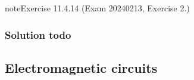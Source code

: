 \documentclass[letterpaper,10pt,english]{jupyterBook}
\begin{document}
\begin{sphinxadmonition}{note}{Exercise 11.4.14 (Exam 2024\sphinxhyphen{}02\sphinxhyphen{}13, Exercise 2.)}



\begin{figure}[htbp]
\centering

\noindent{}
\end{figure}
\subsubsection*{Solution \sphinxhyphen{} todo}
\end{sphinxadmonition}

\sphinxstepscope


\subsection{Electromagnetic circuits}
\label{\detokenize{ch/electrical-engineering-exercises-electromagnetic:electromagnetic-circuits}}\label{\detokenize{ch/electrical-engineering-exercises-electromagnetic:classical-electromagnetism-electrical-engineering-exercises-electromagnetic}}\label{\detokenize{ch/electrical-engineering-exercises-electromagnetic::doc}}
\end{document}
